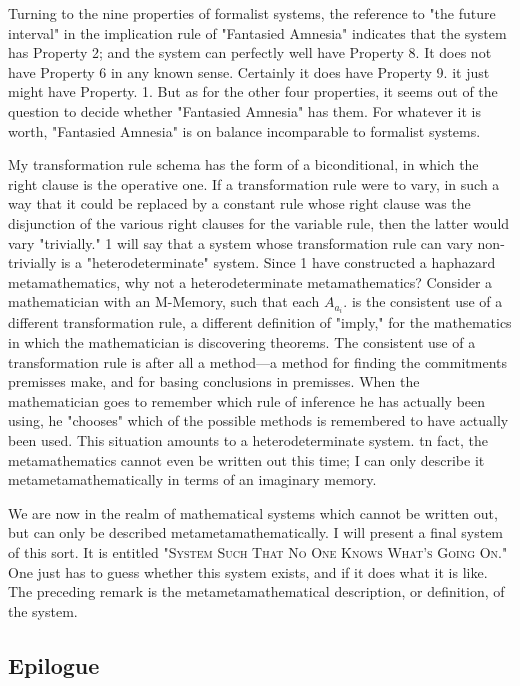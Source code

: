 \documentclass[10pt,twoside,draft]{memoir}
\begin{document}
{Turning to the nine properties of formalist systems, the reference to 
"the future interval" in the implication rule of "Fantasied Amnesia" 
indicates that the system has Property 2; and the system can perfectly well 
have Property 8. It does not have Property 6 in any known sense. Certainly 
it does have Property 9. it just might have Property. 1. But as for the other 
four properties, it seems out of the question to decide whether "Fantasied 
Amnesia" has them. For whatever it is worth, "Fantasied Amnesia" is on 
balance incomparable to formalist systems. 

My transformation rule schema has the form of a biconditional, in 
which the right clause is the operative one. If a transformation rule were to 
vary, in such a way that it could be replaced by a constant rule whose right 
clause was the disjunction of the various right clauses for the variable rule, 
then the latter would vary "trivially." 1 will say that a system whose 
transformation rule can vary non-trivially is a "heterodeterminate" system. 
Since 1 have constructed a haphazard metamathematics, why not a 
heterodeterminate metamathematics? Consider a mathematician with an 
M-Memory, such that each $A_{a_i}$. is the consistent use of a different 
transformation rule, a different definition of "imply," for the mathematics 
in which the mathematician is discovering theorems. The consistent use of a 
transformation rule is after all a method---a method for finding the 
commitments premisses make, and for basing conclusions in premisses. When 
the mathematician goes to remember which rule of inference he has actually 
been using, he "chooses" which of the possible methods is remembered to 
have actually been used. This situation amounts to a heterodeterminate 
system. tn fact, the metamathematics cannot even be written out this time; I 
can only describe it metametamathematically in terms of an imaginary 
memory. 

We are now in the realm of mathematical systems which cannot be 
written out, but can only be described metametamathematically. I will 
present a final system of this sort. It is entitled \textsc{"System Such That No One 
Knows What's Going On."} One just has to guess whether this system exists, 
and if it does what it is like. The preceding remark is the 
metametamathematical description, or definition, of the system. 

\subsection{Epilogue}

}
\end{document}
